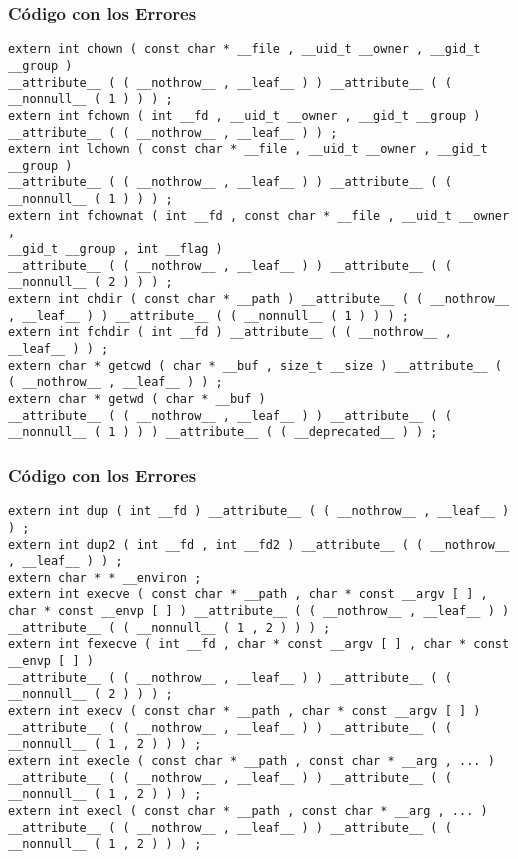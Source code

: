 \documentclass{beamer}
\begin{document}
\begin{frame}[fragile]
\frametitle{C\'odigo con los Errores}
\begin{lstlisting}[style=CStyle]
extern int chown ( const char * __file , __uid_t __owner , __gid_t __group ) 
__attribute__ ( ( __nothrow__ , __leaf__ ) ) __attribute__ ( ( __nonnull__ ( 1 ) ) ) ; 
extern int fchown ( int __fd , __uid_t __owner , __gid_t __group ) __attribute__ ( ( __nothrow__ , __leaf__ ) ) ; 
extern int lchown ( const char * __file , __uid_t __owner , __gid_t __group ) 
__attribute__ ( ( __nothrow__ , __leaf__ ) ) __attribute__ ( ( __nonnull__ ( 1 ) ) ) ; 
extern int fchownat ( int __fd , const char * __file , __uid_t __owner , 
__gid_t __group , int __flag ) 
__attribute__ ( ( __nothrow__ , __leaf__ ) ) __attribute__ ( ( __nonnull__ ( 2 ) ) ) ; 
extern int chdir ( const char * __path ) __attribute__ ( ( __nothrow__ , __leaf__ ) ) __attribute__ ( ( __nonnull__ ( 1 ) ) ) ; 
extern int fchdir ( int __fd ) __attribute__ ( ( __nothrow__ , __leaf__ ) ) ; 
extern char * getcwd ( char * __buf , size_t __size ) __attribute__ ( ( __nothrow__ , __leaf__ ) ) ; 
extern char * getwd ( char * __buf ) 
__attribute__ ( ( __nothrow__ , __leaf__ ) ) __attribute__ ( ( __nonnull__ ( 1 ) ) ) __attribute__ ( ( __deprecated__ ) ) ; 
\end{lstlisting}
\end{frame}
\begin{frame}[fragile]
\frametitle{C\'odigo con los Errores}
\begin{lstlisting}[style=CStyle]
extern int dup ( int __fd ) __attribute__ ( ( __nothrow__ , __leaf__ ) ) ; 
extern int dup2 ( int __fd , int __fd2 ) __attribute__ ( ( __nothrow__ , __leaf__ ) ) ; 
extern char * * __environ ; 
extern int execve ( const char * __path , char * const __argv [ ] , 
char * const __envp [ ] ) __attribute__ ( ( __nothrow__ , __leaf__ ) ) __attribute__ ( ( __nonnull__ ( 1 , 2 ) ) ) ; 
extern int fexecve ( int __fd , char * const __argv [ ] , char * const __envp [ ] ) 
__attribute__ ( ( __nothrow__ , __leaf__ ) ) __attribute__ ( ( __nonnull__ ( 2 ) ) ) ; 
extern int execv ( const char * __path , char * const __argv [ ] ) 
__attribute__ ( ( __nothrow__ , __leaf__ ) ) __attribute__ ( ( __nonnull__ ( 1 , 2 ) ) ) ; 
extern int execle ( const char * __path , const char * __arg , ... ) 
__attribute__ ( ( __nothrow__ , __leaf__ ) ) __attribute__ ( ( __nonnull__ ( 1 , 2 ) ) ) ; 
extern int execl ( const char * __path , const char * __arg , ... ) 
__attribute__ ( ( __nothrow__ , __leaf__ ) ) __attribute__ ( ( __nonnull__ ( 1 , 2 ) ) ) ; 
\end{lstlisting}
\end{frame}
\end{document}
